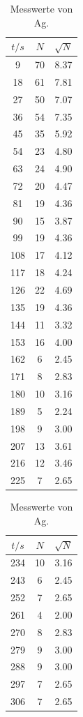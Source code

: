 \begin{table}
    \centering
\caption{Messwerte von Ag.}
\begin{minipage}{0.2\textwidth}
\label{tab:2}
    \centering
	\begin{tabular}{c|c|c}
		\toprule
		{$t / s$} & {$N$}&{$\sqrt{N}$}\\
		\hline
        \midrule
	9&70&8.37\\
	18&61&7.81\\
	27&50&7.07\\
	36&54&7.35\\
	45&35&5.92\\
	54&23&4.80\\
	63&24&4.90\\
	72&20&4.47\\
	81&19&4.36\\
	90&15&3.87\\
	99&19&4.36\\
	108&17&4.12\\
	117&18&4.24\\
	126&22&4.69\\
	135&19&4.36\\
	144&11&3.32\\
	153&16&4.00\\
	162&6&2.45\\
	171&8&2.83\\
	180&10&3.16\\
	189&5&2.24\\
	198&9&3.00\\
	207&13&3.61\\
	216&12&3.46\\
	225&7&2.65\\
	\bottomrule 
	\end{tabular}
\end{minipage}
\begin{minipage}{0.2\textwidth}
    \centering
	\begin{tabular}{c|c|c}
		\toprule
		{$t / s$} & {$N$}&{$\sqrt{N}$}\\
		\hline
        \midrule
	234&10&3.16\\
	243&6&2.45\\
	252&7&2.65\\
	261&4&2.00\\
	270&8&2.83\\
	279&9&3.00\\
	288&9&3.00\\
	297&7&2.65\\
	306&7&2.65\\

\end{tabular}
\end{minipage}
\end{table}
